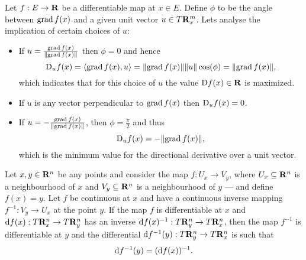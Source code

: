 Let \(f: E \to \mathbf{R}\) be a differentiable map at \(x \in E\). Define \(\phi\) to
be the angle between \(\operatorname{grad} f(x)\) and a given unit vector \(u \in T\mathbf{R}^m_x\).
Lets analyse the implication of certain choices of \(u\):
\begin{itemize}
    \item If \(u = \frac{\operatorname{grad} f(x)}{\lVert\operatorname{grad} f(x)\rVert}\) then \(\phi = 0\) and
          hence
          \[
              \mathrm{D}_u f(x) = \langle \operatorname{grad} f(x), u \rangle = \lVert\operatorname{grad} f(x)\rVert \lVert u\rVert
              \cos(\phi) = \lVert\operatorname{grad} f(x)\rVert,
          \]
          which indicates that for this choice of \(u\) the value \(\mathrm{D} f(x) \in
          \mathbf{R}\) is maximized.
    \item If \(u\) is any vector perpendicular to \(\operatorname{grad} f(x)\) then \(\mathrm{D}_u
          f(x) = 0\).
    \item If \(u = - \frac{\operatorname{grad} f(x)}{\lVert\operatorname{grad} f(x)\rVert}\), then \(\phi = \frac
          \pi 2\) and thus
          \[
              \mathrm{D}_u f(x) = -\lVert\operatorname{grad} f(x)\rVert,
          \]
          which is the minimum value for the directional derivative over a unit
          vector.
\end{itemize}

\begin{theorem}
    Let \(x, y \in \mathbf{R}^n\) be any points and consider the map \(f: U_x \to V_y\),
    where \(U_x \subseteq \mathbf{R}^n\) is a neighbourhood of \(x\) and \(V_y \subseteq
    \mathbf{R}^n\) is a neighbourhood of \(y\) --- and define \(f(x) = y\). Let \(f\) be
    continuous at \(x\) and have a continuous inverse mapping \(f^{-1}: V_y \to
    U_x\) at the point \(y\). If the map \(f\) is differentiable at \(x\) and
    \(\mathrm{d} f(x): T\mathbf{R}^n_x \to T\mathbf{R}^n_y\) has an inverse \(\mathrm{d} f(x)^{-1}: T\mathbf{R}^n_y
    \to T\mathbf{R}^n_x\), then the map \(f^{-1}\) is differentiable at \(y\) and the
    differential \(\mathrm{d} f^{-1}(y): T\mathbf{R}^n_y \to T\mathbf{R}^n_x\) is such that
    \[
        \mathrm{d} f^{-1}(y) = (\mathrm{d} f(x))^{-1}.
    \]
\end{theorem}

